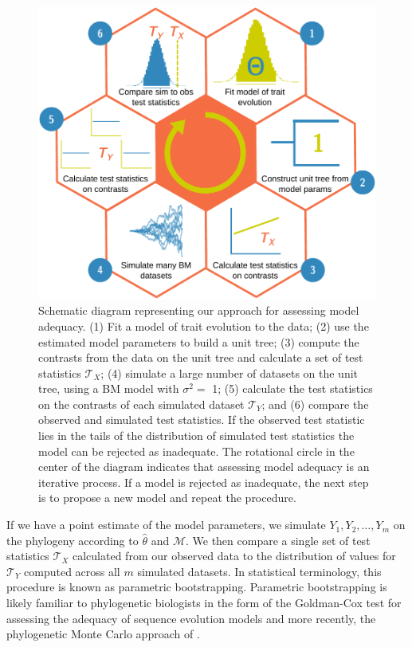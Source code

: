 \begin{figure}[p]
  \centering
  \includegraphics[width=\textwidth]{figs/flow-diagram}
  \caption[Schematic of framework for assessing model adequacy]{Schematic diagram representing our approach for assessing model adequacy. (1) Fit a model of trait evolution to the data; (2) use the estimated model parameters to build a unit tree; (3) compute the contrasts from the data on the unit tree and calculate a set of test statistics $\mathcal{T}_X$; (4) simulate a large number of datasets on the unit tree, using a BM model with $\sigma^2=$ 1; (5) calculate the test statistics on the contrasts of each simulated dataset $\mathcal{T}_Y$; and (6) compare the observed and simulated test statistics. If the observed test statistic lies in the tails of the distribution of simulated test statistics the model can be rejected as inadequate. The rotational circle in the center of the diagram indicates that assessing model adequacy is an iterative process. If a model is rejected as inadequate, the next step is to propose a new model and repeat the procedure.}
  \label{fig:flowchart}
\end{figure}

If we have a point estimate of the model parameters, we simulate $Y_1, Y_2, \ldots, Y_m$ on the phylogeny according to $\hat{\theta}$ and $\mathcal{M}$. We then compare a single set of test statistics $\mathcal{T}_X$ calculated from our observed data to the distribution of values for $\mathcal{T}_Y$ computed across all $m$ simulated datasets. In statistical terminology, this procedure is known as parametric bootstrapping. Parametric bootstrapping is likely familiar to phylogenetic biologists in the form of the Goldman-Cox test \citep{Goldman} for assessing the adequacy of sequence evolution models and more recently, the phylogenetic Monte Carlo approach of \citet{Boettiger2012}.

